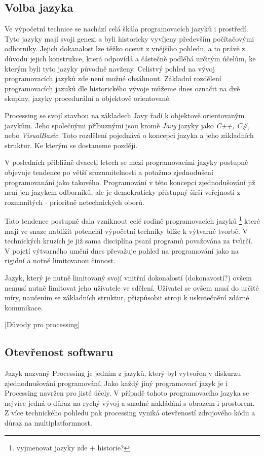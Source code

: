 \documentclass[11pt]{article} %
\begin{document}
\subsection{Volba jazyka}


Ve výpočetní technice se nachází celá škála programovacích jazyků i prostředí. Tyto jazyky mají svoji genezi a byli historicky vyvíjeny především počítačovými odborníky. Jejich dokanalost lze těžko ocenit z vnějšího pohledu, a to právě z důvodu jejich konstrukce, která odpovídá a částečně podléhá určitým účelům, ke kterým byli tyto jazyky původně navženy. Celistvý pohled na vývoj programovacích jazyků zde není možné obsáhnout. Základní rozdělení programovacích jazuků dle historického vývoje můžeme dnes označit na dvě skupiny, jazyky procedurální a objektově orientované.

Processing se svojí stavbou na základech Javy řadí k objektově orientovaným jazykům. Jeho společnými příbuznými jsou kromě {\em Javy} jazyky jako {\em C++, C\#,} nebo {\em VisualBasic}. Toto rozdělení pojednává o koncepci jazyka a jeho základních struktur. Ke kterým se dostaneme později. 

V posledních přibližně dvaceti letech se mezi programovacími jazyky postupně objevuje tendence po větší srozumitelnosti a potažmo zjednodušení programovanání jako takového. Programování v této koncepci zjednodušování již není jen jazykem odborníků, ale je demokraticky přístupný širší veřejnosti z rozmanitých - prioritně netechnických oborů.

Tato tendence postupně dala vzniknout celé rodině programovacích jazyků
\footnote{vyjmenovat jazyky zde + historie?}
které mají ve snaze nablížit potenciál výpočetní techniky blíže k výtvarné tvorbě. V technických kruzích je již sama disciplína psaní programů považována za tvůrčí. V pojetí výtvarného umění dnes převažuje pohled na programování jako na rigidní a notně limitovanou činnost.

Jazyk, který je nutně limitovaný svojí vnitřní dokonalostí (dokonavostí?) ovšem nemusí nutně limitovat jeho uživatele ve sdělení. Uživatel se ovšem musí do určité míry, naučením se základních struktur, přizpůsobit stroji k uskutečnění zdárné komunikace.

[Důvody pro processing]

\subsection{Otevřenost softwaru}

Jazyk nazvaný Processing je jedním z jazyků, který byl vytvořen v diskurzu zjednodnušování programování. Jako každý jiný programovací jazyk je i Processing navržen pro jisté účely. V případě tohoto programovacího jazyka se nejvíce jedná o důraz na rychý vývoj a snadné nakládání s obrazem i prostorem. Z více technického pohledu pak processing vyniká otevřeností zdrojového kódu a důraz na multiplatformnost.
\end{document}
